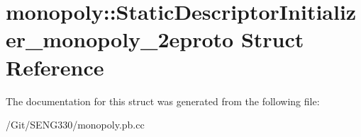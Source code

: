 \hypertarget{structmonopoly_1_1_static_descriptor_initializer__monopoly__2eproto}{}\section{monopoly\+:\+:Static\+Descriptor\+Initializer\+\_\+monopoly\+\_\+2eproto Struct Reference}
\label{structmonopoly_1_1_static_descriptor_initializer__monopoly__2eproto}


The documentation for this struct was generated from the following file\+:\begin{DoxyCompactItemize}
\item 
/\+Git/\+S\+E\+N\+G330/monopoly.\+pb.\+cc\end{DoxyCompactItemize}
